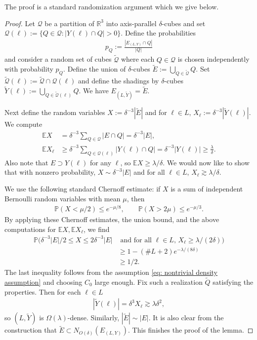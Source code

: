 \documentclass[12pt]{amsart}
\numberwithin{equation}{section}
\newcommand{\R}{\mathbb{R}}
\newcommand{\1}{\mathbbm{1}}
\begin{document}
The proof is a standard randomization argument which we give below. 
\begin{proof}
    Let $\mathcal Q$ be a partition of $\R^3$ into axis-parallel $\delta$-cubes and set $\mathcal Q(\ell) := \{Q \in \mathcal Q : |Y(\ell) \cap Q| > 0\}$. Define the probabilities 
    \begin{align}
        p_Q :=\frac{|E_{(L,Y)} \cap Q|}{|Q|}
    \end{align}
    and consider a
    random set of cubes $ \tilde {\mathcal Q}$ where each $Q \in \mathcal Q$ is chosen independently with probability $p_Q$. Define the union of $\delta$-cubes
    $\tilde E := \bigcup_{Q \in \tilde {\mathcal Q}} Q$.
    Set 
    $\tilde {\mathcal Q}(\ell) := \tilde {\mathcal Q} \cap \mathcal Q(\ell)$ and 
    define the shadings by $\delta$-cubes $\tilde Y(\ell) := \bigcup_{Q \in \tilde {\mathcal Q}(\ell)} Q$.
    We have $E_{(L, \tilde Y)} = \tilde E$. 

    
    Next define the random variables $X := \delta^{-3} |\tilde E|$ and for $\ell \in L$, $X_\ell := \delta^{-3} |\tilde Y(\ell)|$. We compute 
    \begin{align}
        \mathbb E X &= \delta^{-3} \sum_{Q \in \mathcal Q} |E \cap Q| = \delta^{-3} |E|, \\
        \mathbb E X_\ell &\geq \delta^{-3} \sum_{Q \in \mathcal Q(\ell)} |Y(\ell) \cap Q| = \delta^{-3} |Y(\ell)| \geq \frac{\lambda}{\delta}.
    \end{align}
    Also note that $E \supset Y(\ell)$ for any $\ell$, so $\mathbb E X \geq \lambda/\delta$. We would now like to show that with nonzero probability, $X \sim \delta^{-3} |E|$ and for all $\ell \in L$, $X_\ell \gtrsim \lambda /\delta$. 
    
    We use the following standard Chernoff estimate: if $X$ is a sum of independent Bernoulli random variables with mean $\mu$, then 
    \begin{align}
        \mathbb P(X < \mu/2) \leq e^{-\mu/8}, \qquad \mathbb P(X > 2\mu) \leq e^{-\mu/3}.
    \end{align}
    By applying these Chernoff estimates, the union bound, and the above computations for $\mathbb EX, \mathbb EX_\ell$, we find 
    \begin{align}
        \mathbb P(\delta^{-3}|E|/2 \leq X \leq 2\delta^{-3}|E| &\text{ and for all $\ell \in L$, } X_\ell \geq \lambda/(2\delta)) \\ &\geq 1 - (\#L +2)e^{-\lambda/(8\delta)} \\
        &\geq 1/2.
    \end{align}
    The last inequality follows from the assumption \eqref{eq: nontrivial density assumption} and choosing $C_0$ large enough. Fix such a realization $\tilde Q$ satisfying the properties. Then for each $\ell \in L$
    \begin{align}
        |\tilde Y(\ell)| = \delta^3 X_\ell \gtrsim \lambda \delta^2,
    \end{align}
    so $(L,\tilde Y)$ is $\Omega(\lambda)$-dense. Similarly, $|\tilde E| \sim |E|$. It is also clear from the construction that $\tilde E \subset N_{O(\delta)}(E_{(L,Y)})$. This finishes the proof of the lemma.  
\end{proof}
\end{document}
